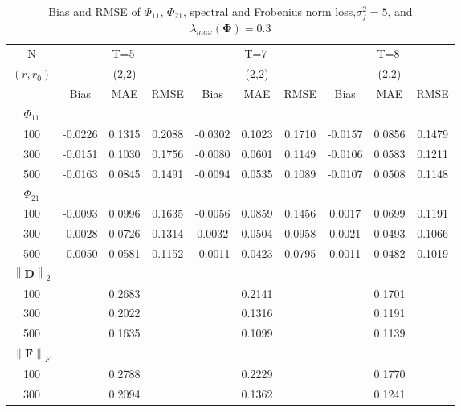 \documentclass[12pt,a4paper,hyperref]{article}
\begin{document}
\begin{table}[H]
\caption{Bias and RMSE of $\Phi_{11}$, $\Phi_{21}$, spectral and Frobenius norm loss,$\sigma^{2}_{f}=5$,  and $\lambda_{max}(\boldsymbol{\Phi})=0.3$}
\centering
\tabcolsep=0.11cm
\begin{threeparttable}
\begin{tabular} {*{10}{c}}
\toprule
N& \multicolumn{3}{c}{T=5}&\multicolumn{3}{c}{T=7}&\multicolumn{3}{c}{T=8}\\
\cmidrule(lr){1-10}
$(r,r_{0})$ &   &(2,2)  &  &   &(2,2)  & &  &(2,2) & \\
\cmidrule(lr){1-4} \cmidrule(lr){5-7}\cmidrule(lr){8-10}
& \multicolumn{1}{c}{Bias} &\multicolumn{1}{c}{MAE}& \multicolumn{1}{c}{RMSE}&\multicolumn{1}{c}{Bias} &\multicolumn{1}{c}{MAE}& \multicolumn{1}{c}{RMSE}&\multicolumn{1}{c}{Bias}&\multicolumn{1}{c}{MAE} & \multicolumn{1}{c}{RMSE}\\
  \cmidrule(lr){2-4} \cmidrule(lr){5-7} \cmidrule(lr){8-10}
 $\Phi_{11}$\\
\cmidrule(lr){1-10}
 100& -0.0226& 0.1315&0.2088 & -0.0302 & 0.1023& 0.1710& -0.0157& 0.0856&0.1479 \\
300& -0.0151& 0.1030& 0.1756& -0.0080& 0.0601& 0.1149&-0.0106 &0.0583 &0.1211\\
500&-0.0163 & 0.0845&0.1491 &-0.0094  &0.0535 &0.1089 &-0.0107 &0.0508& 0.1148\\
\cmidrule(lr){1-10}
$\Phi_{21}$\\
\cmidrule(lr){1-4}   \cmidrule(lr){5-7}   \cmidrule(lr){8-10}
100&-0.0093 &0.0996 & 0.1635&  -0.0056&0.0859 &0.1456 &0.0017& 0.0699&0.1191\\
300&-0.0028 & 0.0726& 0.1314&  0.0032&0.0504 & 0.0958& 0.0021&0.0493 &0.1066\\
500& -0.0050& 0.0581& 0.1152& -0.0011& 0.0423& 0.0795&0.0011 &0.0482 & 0.1019\\
\cmidrule(lr){1-10}
$\left\| \boldsymbol{D} \right\|_{2} $\\
\cmidrule(lr){1-4}   \cmidrule(lr){5-7}   \cmidrule(lr){8-10}
100& &0.2683 & &  &0.2141 & & &0.1701 & \\
300& &0.2022 & &  &0.1316& & &0.1191 &\\
500& &0.1635 & &  &0.1099 & & &0.1139 & \\
\cmidrule(lr){1-10}
$\left\| \boldsymbol{F} \right\|_{F} $\\
\cmidrule(lr){1-4}   \cmidrule(lr){5-7}   \cmidrule(lr){8-10}
100& &0.2788& &  &0.2229& & & 0.1770& \\
300& &0.2094 & &  &0.1362 & & &0.1241 &\\

\end{tabular}
\end{threeparttable}
\end{table}
\end{document}
